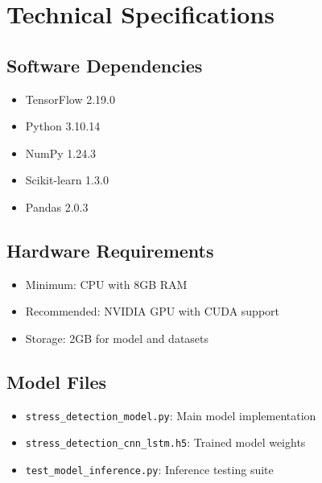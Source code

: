 \documentclass[11pt,a4paper]{article}
\begin{document}
\section{Technical Specifications}

\subsection{Software Dependencies}
\begin{itemize}
    \item TensorFlow 2.19.0
    \item Python 3.10.14
    \item NumPy 1.24.3
    \item Scikit-learn 1.3.0
    \item Pandas 2.0.3
\end{itemize}

\subsection{Hardware Requirements}
\begin{itemize}
    \item Minimum: CPU with 8GB RAM
    \item Recommended: NVIDIA GPU with CUDA support
    \item Storage: 2GB for model and datasets
\end{itemize}

\subsection{Model Files}
\begin{itemize}
    \item \texttt{stress\_detection\_model.py}: Main model implementation
    \item \texttt{stress\_detection\_cnn\_lstm.h5}: Trained model weights
    \item \texttt{test\_model\_inference.py}: Inference testing suite
\end{itemize}
\end{document}
